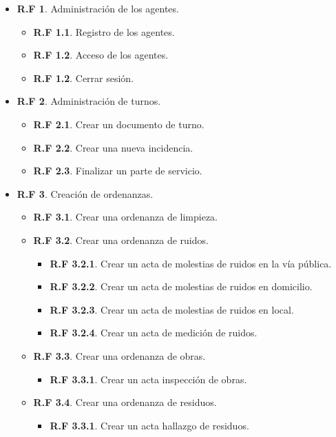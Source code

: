 \begin{itemize}
	
	\item \textbf{R.F 1}. Administración de los agentes.
	\begin{itemize}
		\item \textbf{R.F 1.1}. Registro de los agentes.
		\item \textbf{R.F 1.2}. Acceso de los agentes.
		\item \textbf{R.F 1.2}. Cerrar sesión.
	\end{itemize}

	\item \textbf{R.F 2}. Administración de turnos.
	\begin{itemize}
		\item \textbf{R.F 2.1}. Crear un documento de turno.
		\item \textbf{R.F 2.2}. Crear una nueva incidencia.
		\item \textbf{R.F 2.3}. Finalizar un parte de servicio.
	\end{itemize}

	\item \textbf{R.F 3}. Creación de ordenanzas.
	\begin{itemize}
		\item \textbf{R.F 3.1}. Crear una ordenanza de limpieza.
		\item \textbf{R.F 3.2}. Crear una ordenanza de ruidos.
		\begin{itemize}
			\item \textbf{R.F 3.2.1}. Crear un acta de molestias de ruidos en la vía pública.
			\item \textbf{R.F 3.2.2}. Crear un acta de molestias de ruidos en domicilio.
			\item \textbf{R.F 3.2.3}. Crear un acta de molestias de ruidos en local.
			\item \textbf{R.F 3.2.4}. Crear un acta de medición de ruidos.
		\end{itemize}
		\item \textbf{R.F 3.3}. Crear una ordenanza de obras.
		\begin{itemize}
			\item \textbf{R.F 3.3.1}. Crear un acta inspección de obras.
		\end{itemize}
		\item \textbf{R.F 3.4}. Crear una ordenanza de residuos.
		\begin{itemize}
			\item \textbf{R.F 3.3.1}. Crear un acta hallazgo de residuos.
		\end{itemize}
	\end{itemize}


\end{itemize}
